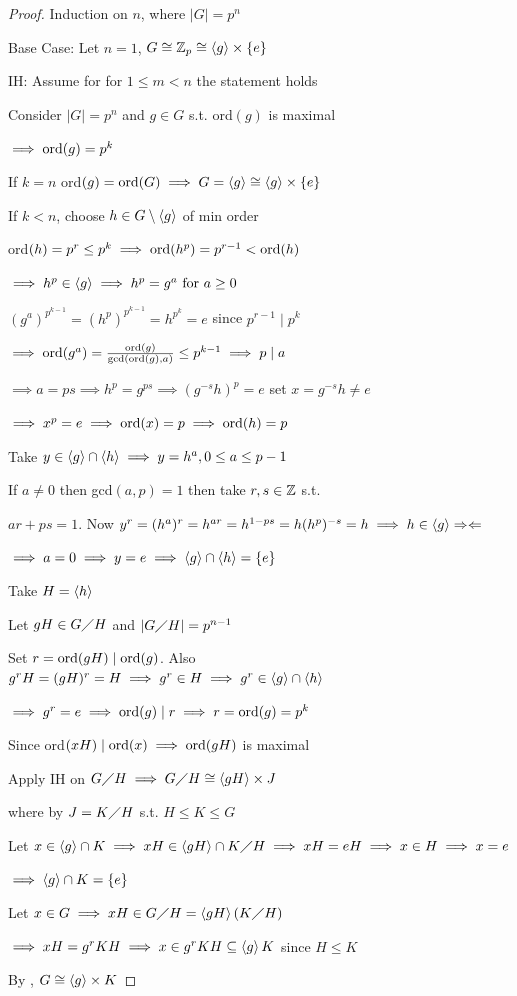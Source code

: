 \begin{proof}
    Induction on $n$, where $|G|=p^n$

    Base Case: Let $n=1$, $G \cong \mathbb{Z}_p \cong \left\langle g \right\rangle \times \left\{ e \right\}$

    IH: Assume for for $1 \leq m < n$ the statement holds

    Consider $|G|=p^n$ and $g\in G$ s.t. ord$(g)$ is maximal

    $\implies \text{ord}(g)=p^k$

    If $k=n$ ord$(g)=\text{ord}(G) \implies G=\left\langle g \right\rangle \cong \left\langle g \right\rangle \times \left\{ e \right\}$

    If $k < n$, choose $h \in G \setminus \left\langle g \right\rangle$ of min order

    ord$(h)=p^r \leq p^k \implies \text{ord}(h^p)=p^{r-1} < \text{ord}(h)$

    $\implies h^p \in \left\langle g \right\rangle \implies h^p=g^a \text{ for } a\geq0$

    $(g^a)^{p^{k-1}}=(h^p)^{p^{k-1}}=h^{p^k}=e$ since $p^{r-1} \mid p^k$

    $\implies \text{ord}(g^a)=\frac{\text{ord}(g)}{\text{gcd}(\text{ord}(g),a)}\leq p^{k-1} \implies p \mid a$

    $\implies a=ps \implies h^p=g^{ps} \implies (g^{-s}h)^p=e$ set $x=g^{-s}h \neq e$

    $\implies x^p=e \implies \text{ord}(x)=p \implies \text{ord}(h)=p$

    Take $y\in \left\langle g \right\rangle \cap \left\langle h \right\rangle \implies y=h^a, 0\leq a \leq p-1$

    If $a \neq 0$ then gcd$(a,p)=1$ then take $r,s\in \mathbb{Z}$ s.t.

    $ar+ps=1$. Now $y^r=(h^a)^r=h^{ar}=h^{1-ps}=h(h^p)^{-s}=h \implies h \in \left\langle g \right\rangle \Rightarrow \Leftarrow$

    $\implies a=0 \implies y=e \implies \left\langle g \right\rangle\cap\left\langle h \right\rangle=\left\{ e \right\}$

    Take $H=\left\langle h \right\rangle$

    Let $gH \in G \diagup H$ and $|G \diagup H|=p^{n-1}$

    Set $r=\text{ord}(gH) \mid \text{ord}(g)$. Also $g^rH=(gH)^r=H \implies g^r\in H \implies g^r \in \left\langle g \right\rangle \cap \left\langle h \right\rangle$
    
    $\implies g^r=e \implies \text{ord}(g) \mid r \implies r=\text{ord}(g)=p^k$

    Since ord$(xH) \mid \text{ord}(x) \implies \text{ord}(gH)$ is maximal

    Apply IH on $G \diagup H \implies G \diagup H \cong \left\langle gH \right\rangle \times J$ 
    
    where by  $J=K \diagup H$ s.t. $H \leq K \leq G$

    Let $x\in \left\langle g \right\rangle\cap K \implies xH \in \left\langle gH \right\rangle \cap K \diagup H \implies xH=eH \implies x \in H \implies x=e$ 
    
    $\implies \left\langle g \right\rangle\cap K = \left\{ e \right\}$

    Let $x\in G \implies xH \in G \diagup H = \left\langle gH \right\rangle(K \diagup H)$

    $\implies xH=g^rKH \implies x\in g^rKH \subseteq \left\langle g \right\rangle K$ since $H \leq K$

    By , $G \cong \left\langle g \right\rangle\times K$
\end{proof}


